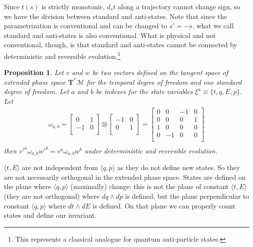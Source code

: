 \documentclass[aps,pra,10pt,twocolumn,floatfix,nofootinbib]{revtex4-1}
\newtheorem{prop}[thm]{Proposition}
\theoremstyle{definition}
\begin{document}
Since $t(s)$ is strictly monotonic, $d_{s}t$ along a trajectory cannot change sign, so we have the division between standard and anti-states. Note that since the parametrization is conventional and can be changed to $s'=-s$, what we call standard and anti-states is also conventional. What is physical and not conventional, though, is that standard and anti-states cannot be connected by deterministic and reversible evolution.\footnote{This represents a classical analogue for quantum anti-particle states.}

\begin{prop}\label{tdofInvariant}
Let $v$ and $w$ be two vectors defined on the tangent space of extended phase space $\mathbf{T}^*\mathcal{M}$ for the temporal degree of freedom and one standard degree of freedom. Let $a$ and $b$ be indexes for the state variables $\xi^a\equiv\{t, q, E, p\}$. Let
\begin{align*}
\omega_{a, b} =  \left[
  \begin{array}{cc}
    0 & 1 \\
    -1 & 0 \\
  \end{array}
\right] \otimes \left[
  \begin{array}{cc}
    -1 & 0 \\
    0 & 1 \\
  \end{array}
\right]
= \left[
  \begin{array}{cccc}
    0 & 0 & -1 & 0 \\
    0 & 0 & 0 & 1 \\
    1 & 0 & 0 & 0 \\
    0 & -1 & 0 & 0 \\
  \end{array}
\right] \\
\end{align*}
then $v'^{a} \omega_{a, b} w'^{b}=v^{a} \omega_{a, b} w^{b}$ under deterministic and reversible evolution.
\end{prop}

$\langle t, E \rangle$ are not independent from $\langle q, p \rangle$ as they do not define new states. So they are not necessarily orthogonal in the extended phase space. States are defined on the plane where $\langle q, p \rangle$ (maximally) change: this is not the plane of constant $\langle t, E \rangle$ (they are not orthogonal) where $dq \wedge dp$ is defined, but the plane perpendicular to constant $\langle q, p \rangle$ where $dt \wedge dE$ is defined. On that plane we can properly count states and define our invariant.
\end{document}
